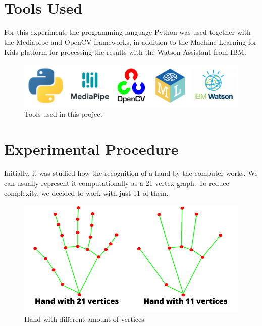 \documentclass[a4paper, 12pt]{article}
\begin{document}
\section{Tools Used}

For this experiment, the programming language Python\cite{python} was used together with the Mediapipe\cite{mediapipe} and OpenCV\cite{opencv} frameworks, in addition to the Machine Learning for Kids\cite{ml4kids} platform for processing the results with the Watson Assistant from IBM\cite{watson}.

\begin{figure}[!ht]
\centering
\includegraphics[scale=0.9]{img/tools.png}
\caption{Tools used in this project}
\label{figure_2}
\end{figure}


\section{Experimental Procedure}

Initially, it was studied how the recognition of a hand by the computer works. We can usually represent it computationally as a 21-vertex graph. To reduce complexity, we decided to work with just 11 of them.
 
\begin{figure}[!ht]
\centering
\includegraphics[scale=0.4]{img/hand_vertices.png}
\caption{Hand with different amount of vertices}
\label{figure_3}
\end{figure}
\end{document}
